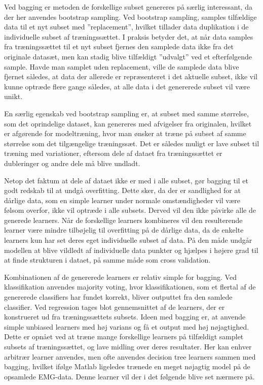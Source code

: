 Ved bagging er metoden de forskellige subset genereres på særlig interessant, da der her anvendes bootstrap sampling.
Ved bootstrap sampling, samples tilfældige data til et nyt subset med ”replacement”, hvilket tillader data duplikation i de individuelle subset af træningssættet. I praksis betyder det, at når data samples fra træningssættet til et nyt subset fjernes den samplede data ikke fra det originale datasæt, men kan stadig blive tilfældigt ”udvalgt” ved et efterfølgende sample. Havde man samplet uden replacement, ville de samplede data blive fjernet således, at data der allerede er repræsenteret i det aktuelle subset, ikke vil kunne optræde flere gange således, at alle data i det genererede subset vil være unikt.

En særlig egenskab ved bootstrap sampling er, at subset med samme størrelse, som det oprindelige dataset, kan genereres med afvigelser fra originalen, hvilket er afgørende for modeltræning, hvor man ønsker at træne på subset af samme størrelse som det tilgængelige træningssæt. Det er således muligt er lave subset til træning med variationer, eftersom dele af dataet fra træningssættet er dubleringer og andre dele må blive undladt. 

Netop det faktum at dele af dataet ikke er med i alle subset, gør bagging til et godt redskab til at undgå overfitting. Dette sker, da der er sandlighed for at dårlige data, som en simple learner under normale omstændigheder vil være følsom overfor, ikke vil optræde i alle subsets. Derved vil den ikke påvirke alle de generede learners. Når de forskellige learners kombineres vil den resulterende learner være mindre tilbøjelig til overfitting på de dårlige data, da de enkelte learners kun har set deres eget individuelle subset af data. På den måde undgår modellen at blive vildledt af individuelle data punkter og hjælpes i højere grad til at finde strukturen i dataet, på samme måde som cross validation.

Kombinationen af de genererede learners er relativ simple for bagging. Ved klassifikation anvendes majority voting, hvor klassifikationen, som et flertal af de genererede classifiers har fundet korrekt, bliver outputtet fra den samlede classifier.
Ved regression tages blot gennemsnittet af de learners, der er konstrueret ud fra træningssættets subsets. Ideen med bagging er, at anvende simple unbiased learners med høj varians og få et output med høj nøjagtighed. Dette er opnået ved at træne mange forskellige learners på tilfældigt samplet subsets af træningssættet, og lave midling over deres resultater. Her kan enhver arbitrær learner anvendes, men ofte anvendes decision tree learners sammen med bagging, hvilket ifølge Matlab ligeledes trænede en meget nøjagtig model på de opsamlede EMG-data. Denne learner vil der i det følgende blive set nærmere på.

